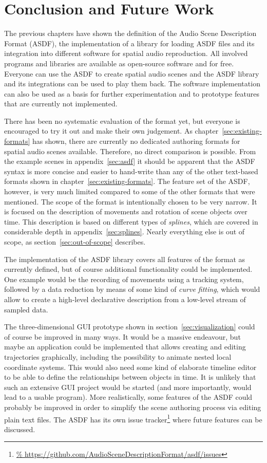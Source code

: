 \chapter{Conclusion and Future Work}
\label{sec:conclusion}

The previous chapters have shown
the definition of the Audio Scene Description Format (ASDF),
the implementation of a library for loading ASDF files
and its integration into different software for spatial audio reproduction.
All involved programs and libraries are available as open-source software
and for free.
Everyone can use the ASDF to create spatial audio scenes
and the ASDF library and its integrations can be used to play them back.
The software implementation can also be used as a basis for further
experimentation and to prototype features that are currently not implemented.

There has been no systematic evaluation of the format yet,
but everyone is encouraged to try it out and make their own judgement.
As chapter~\ref{sec:existing-formats} has shown,
there are currently no dedicated authoring formats
for spatial audio scenes available.
Therefore, no direct comparison is possible.
From the example scenes in appendix~\ref{sec:asdf} it should be apparent
that the ASDF syntax is more concise and easier to hand-write
than any of the other text-based formats
shown in chapter~\ref{sec:existing-formats}.
The feature set of the ASDF, however,
is very much limited compared to some of the other formats that were mentioned.
The scope of the format is intentionally chosen to be very narrow.
It is focused on the description of
movements and rotation of scene objects over time.
This description is based on different types of \emph{splines},
which are covered in considerable depth in appendix~\ref{sec:splines}.
Nearly everything else is out of scope,
as section~\ref{sec:out-of-scope} describes.

The implementation of the ASDF library covers all features of the format
as currently defined,
but of course additional functionality could be implemented.
One example would be the recording of movements using a tracking system,
followed by a data reduction by means of some kind of \emph{curve fitting},
which would allow to create a high-level declarative description
from a low-level stream of sampled data.

The three-dimensional GUI prototype shown in section~\ref{sec:visualization}
could of course be improved in many ways.
It would be a massive endeavour,
but maybe an application could be implemented that allows
creating and editing trajectories graphically, including the possibility
to animate nested local coordinate systems.
This would also need some kind of elaborate timeline editor
to be able to define the relationships between objects in time.
It is unlikely that such an extensive GUI project would be started
(and more importantly, would lead to a usable program).
More realistically,
some features of the ASDF could probably be improved in order to
simplify the scene authoring process via editing plain text files.
The ASDF has its own issue tracker\footnote{\url{%
https://github.com/AudioSceneDescriptionFormat/asdf/issues}}
where future features can be discussed.

